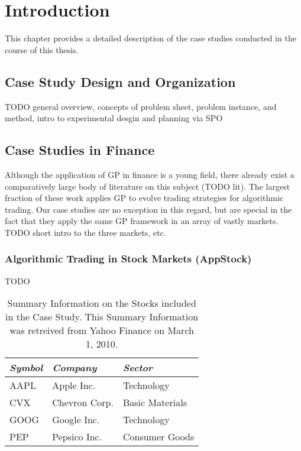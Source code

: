 
\chapter{Introduction}
This chapter provides a detailed description of the case studies conducted in the course of this thesis.
\lipsum[1]


\section{Case Study Design and Organization}
TODO general overview, concepts of problem sheet, problem instance, and method, intro to
experimental desgin and planning via SPO

\lipsum[2]


\section{Case Studies in Finance}
Although the application of GP in finance is a young field, there already exist a comparatively
large body of literature on this subject (TODO lit). The largest fraction of these work applies GP
to evolve trading strategies for algorithmic trading. Our case studies are no exception in this
regard, but are special in the fact that they apply the same GP framework in an array of vastly
markets. TODO short intro to the three markets, etc.

\subsection{Algorithmic Trading in Stock Markets {\sf (AppStock)}}
TODO

\begin{table}[ht]
  \caption{Summary Information on the Stocks included in the Case Study. This Summary Information was retreived from Yahoo Finance on March 1, 2010.}
  \begin{tabular}{lll}
    \toprule
    {\em Symbol} & {\em Company} & {\em Sector}    \\
    \midrule
    {\sf AAPL}   & Apple Inc.    & Technology      \\
    {\sf CVX}    & Chevron Corp. & Basic Materials \\
    {\sf GOOG}   & Google Inc.   & Technology      \\
    {\sf PEP}    & Pepsico Inc.  & Consumer Goods  \\
    \bottomrule
  \end{tabular}
\end{table}

